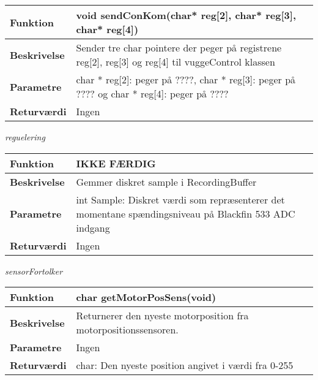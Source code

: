 \begin{center}
    \begin{tabular}{ | l | p{10cm} |}
    \hline
    \textbf{Funktion}	 	& void sendConKom(char* reg[2], char* reg[3], char* reg[4])								\\ \hline
    \textbf{Beskrivelse} 	& Sender tre char pointere der peger på registrene reg[2], reg[3] og reg[4] til vuggeControl klassen					\\ \hline
    \textbf{Parametre}		& char * reg[2]: peger på ????, char * reg[3]: peger på ???? og char * reg[4]: peger på ????				 		\\ \hline
    \textbf{Returværdi} 	& Ingen		 												\\ \hline
    \end{tabular}
\end{center}

\textit{reguelering} \\

\begin{center}
    \begin{tabular}{ | l | p{10cm} |}
    \hline
    \textbf{Funktion}	 	& IKKE FÆRDIG								\\ \hline
    \textbf{Beskrivelse} 	& Gemmer diskret sample i RecordingBuffer					\\ \hline
    \textbf{Parametre}		& int Sample: Diskret værdi som repræsenterer det momentane spændingsniveau på Blackfin 533 ADC indgang														 		\\ \hline
    \textbf{Returværdi} 	& Ingen		 												\\ \hline
    \end{tabular}
\end{center}

\textit{sensorFortolker} \\

\begin{center}
    \begin{tabular}{ | l | p{10cm} |}
    \hline
    \textbf{Funktion}	 	& char getMotorPosSens(void)								\\ \hline
    \textbf{Beskrivelse} 	& Returnerer den nyeste motorposition fra motorpositionssensoren.					\\ \hline
    \textbf{Parametre}		& Ingen								 		\\ \hline
    \textbf{Returværdi} 	& char: Den nyeste position angivet i værdi fra 0-255		 												\\ \hline
    \end{tabular}
\end{center}


